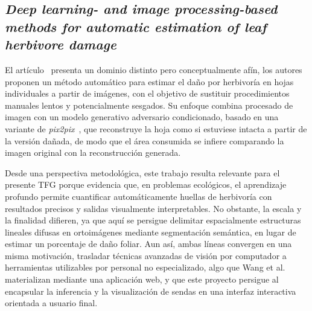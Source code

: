 \subsection { \textit{ Deep learning- and image processing-based methods for automatic estimation of leaf herbivore damage}}

El artículo~\cite{Wang2024} presenta un dominio distinto pero conceptualmente afín, los autores proponen un método automático para estimar el daño por herbivoría en hojas individuales a partir de imágenes, con el objetivo de sustituir procedimientos manuales lentos y potencialmente sesgados. Su enfoque combina procesado de imagen con un modelo generativo adversario condicionado, basado en una variante de \textit{pix2pix}~\cite{Isola2017}, que reconstruye la hoja como si estuviese intacta a partir de la versión dañada, de modo que el área consumida se infiere comparando la imagen original con la reconstrucción generada.

Desde una perspectiva metodológica, este trabajo resulta relevante para el presente TFG porque evidencia que, en problemas ecológicos, el aprendizaje profundo permite cuantificar automáticamente huellas de herbivoría con resultados precisos y salidas visualmente interpretables. No obstante, la escala y la finalidad difieren, ya que aquí se persigue delimitar espacialmente estructuras lineales difusas en ortoimágenes mediante segmentación semántica, en lugar de estimar un porcentaje de daño foliar. Aun así, ambas líneas convergen en una misma motivación, trasladar técnicas avanzadas de visión por computador a herramientas utilizables por personal no especializado, algo que Wang et al. materializan mediante una aplicación web, y que este proyecto persigue al encapsular la inferencia y la visualización de sendas en una interfaz interactiva orientada a usuario final.



